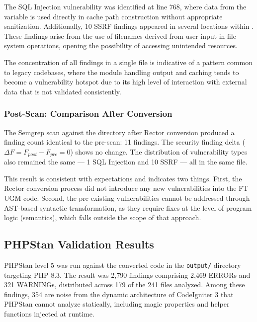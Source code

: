 The SQL Injection vulnerability was identified at line 768, where data from the \texttt{} variable is used directly in cache path construction without appropriate sanitization. Additionally, 10 SSRF findings appeared in several locations within \texttt{}. These findings arise from the use of filenames derived from user input in file system operations, opening the possibility of accessing unintended resources.

The concentration of all findings in a single file is indicative of a pattern common to legacy codebases, where the module handling output and caching tends to become a vulnerability hotspot due to its high level of interaction with external data that is not validated consistently.

\subsubsection{Post-Scan: Comparison After Conversion}

The Semgrep scan against the \texttt{} directory after Rector conversion produced a finding count identical to the pre-scan: 11 findings. The security finding delta ($\Delta F = F_{post} - F_{pre} = 0$) shows no change. The distribution of vulnerability types also remained the same — 1 SQL Injection and 10 SSRF — all in the same file.

This result is consistent with expectations and indicates two things. First, the Rector conversion process did not introduce any new vulnerabilities into the FT UGM code. Second, the pre-existing vulnerabilities cannot be addressed through AST-based syntactic transformation, as they require fixes at the level of program logic (semantics), which falls outside the scope of that approach.

\subsection{PHPStan Validation Results}

PHPStan level 5 was run against the converted code in the \texttt{output/} directory targeting PHP 8.3. The result was 2,790 findings comprising 2,469 ERRORs and 321 WARNINGs, distributed across 179 of the 241 files analyzed. Among these findings, 354 are noise from the dynamic architecture of CodeIgniter 3 that PHPStan cannot analyze statically, including magic properties and helper functions injected at runtime.

